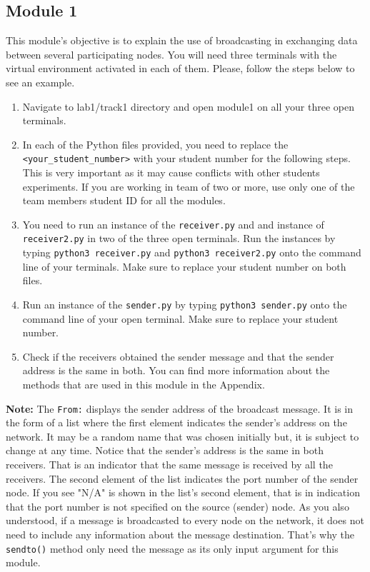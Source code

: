 \documentclass[11pt]{article}
\begin{document}
\subsection{Module 1}
\label{subsec:module1}
This module's objective is to explain the use of broadcasting in exchanging data between several participating nodes. You will need three terminals with the virtual environment activated in each of them. Please, follow the steps below to see an example.
\begin{enumerate}
    \item Navigate to lab1/track1 directory and open module1 on all your three open terminals.
    \item In each of the Python files provided, you need to replace the \texttt{<your\_student\_number>} with your student number for the following steps. This is very important as it may cause conflicts with other students experiments. If you are working in team of two or more, use only one of the team members student ID for all the modules.
    \item You need to run an instance of the \texttt{receiver.py} and and instance of \texttt{receiver2.py} in two of the three open terminals. Run the instances by typing \texttt{python3 receiver.py} and \texttt{python3 receiver2.py} onto the command line of your terminals. Make sure to replace your student number on both files.
    \item Run an instance of the \texttt{sender.py} by typing \texttt{python3 sender.py} onto the command line of your open terminal. Make sure to replace your student number.
    \item Check if the receivers obtained the sender message and that the sender address is the same in both. You can find more information about the methods that are used in this module in the Appendix.
\end{enumerate}


\textbf{Note:}
The \texttt{From:} displays the sender address of the broadcast message.
It is in the form of a list where the first element indicates the sender's address on the network.
It may be a random name that was chosen initially but, it is subject to change at any time.
Notice that the sender's address is the same in both receivers. That is an indicator that the same message is received by all the receivers.
The second element of the list indicates the port number of the sender node.
If you see "N/A" is shown in the list's second element, that is in indication that the port number is not specified on the source (sender) node.
As you also understood, if a message is broadcasted to every node on the network, it does not need to include any information about the message destination.
That's why the \texttt{sendto()} method only need the message as its only input argument for this module.
\end{document}
